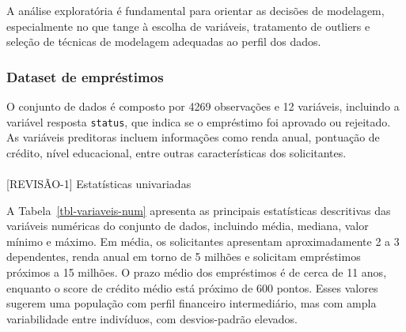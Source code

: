 \documentclass[
  brazilian,
  12pt,
  letterpaper,
  DIV=11,
  numbers=noendperiod]{scrartcl}
\makeatletter
\let\oldparagraph\paragraph
\renewcommand{\paragraph}{
    \@ifstar
      \xxxParagraphStar
      \xxxParagraphNoStar
  }
\newcommand{\xxxParagraphStar}[1]{\oldparagraph*{#1}\mbox{}}
\newcommand{\xxxParagraphNoStar}[1]{\oldparagraph{#1}\mbox{}}
\makeatother
\begin{document}
A análise exploratória é fundamental para orientar as decisões de
modelagem, especialmente no que tange à escolha de variáveis, tratamento
de outliers e seleção de técnicas de modelagem adequadas ao perfil dos
dados.

\subsubsection{Dataset de empréstimos}\label{dataset-de-empruxe9stimos}

O conjunto de dados é composto por 4269 observações e 12 variáveis,
incluindo a variável resposta \texttt{status}, que indica se o
empréstimo foi aprovado ou rejeitado. As variáveis preditoras incluem
informações como renda anual, pontuação de crédito, nível educacional,
entre outras características dos solicitantes.

\paragraph{{[}REVISÃO-1{]} Estatísticas
univariadas}\label{revisuxe3o-1-estatuxedsticas-univariadas}

A Tabela~\ref{tbl-variaveis-num} apresenta as principais estatísticas
descritivas das variáveis numéricas do conjunto de dados, incluindo
média, mediana, valor mínimo e máximo. Em média, os solicitantes
apresentam aproximadamente 2 a 3 dependentes, renda anual em torno de 5
milhões e solicitam empréstimos próximos a 15 milhões. O prazo médio dos
empréstimos é de cerca de 11 anos, enquanto o score de crédito médio
está próximo de 600 pontos. Esses valores sugerem uma população com
perfil financeiro intermediário, mas com ampla variabilidade entre
indivíduos, com desvios-padrão elevados.
\end{document}
